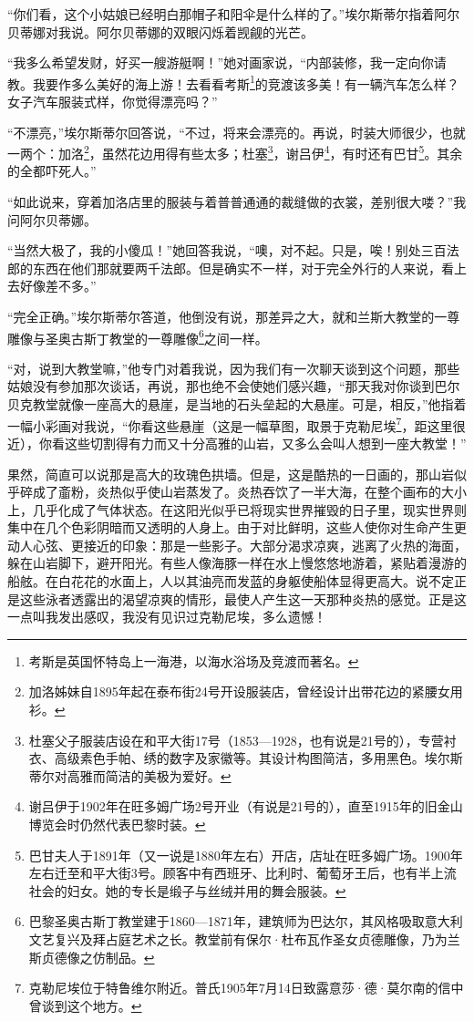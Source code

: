 \par “你们看，这个小姑娘已经明白那帽子和阳伞是什么样的了。”埃尔斯蒂尔指着阿尔贝蒂娜对我说。阿尔贝蒂娜的双眼闪烁着觊觎的光芒。
\par “我多么希望发财，好买一艘游艇啊！”她对画家说，“内部装修，我一定向你请教。我要作多么美好的海上游！去看看考斯\footnote{考斯是英国怀特岛上一海港，以海水浴场及竞渡而著名。}的竞渡该多美！有一辆汽车怎么样？女子汽车服装式样，你觉得漂亮吗？”
\par “不漂亮，”埃尔斯蒂尔回答说，“不过，将来会漂亮的。再说，时装大师很少，也就一两个：加洛\footnote{加洛姊妹自1895年起在泰布街24号开设服装店，曾经设计出带花边的紧腰女用衫。}，虽然花边用得有些太多；杜塞\footnote{杜塞父子服装店设在和平大街17号（1853—1928，也有说是21号的），专营衬衣、高级素色手帕、绣的数字及家徽等。其设计构图简洁，多用黑色。埃尔斯蒂尔对高雅而简洁的美极为爱好。}，谢吕伊\footnote{谢吕伊于1902年在旺多姆广场2号开业（有说是21号的），直至1915年的旧金山博览会时仍然代表巴黎时装。}，有时还有巴甘\footnote{巴甘夫人于1891年（又一说是1880年左右）开店，店址在旺多姆广场。1900年左右迁至和平大街3号。顾客中有西班牙、比利时、葡萄牙王后，也有半上流社会的妇女。她的专长是缎子与丝绒并用的舞会服装。}。其余的全都吓死人。”
\par “如此说来，穿着加洛店里的服装与着普普通通的裁缝做的衣裳，差别很大喽？”我问阿尔贝蒂娜。
\par “当然大极了，我的小傻瓜！”她回答我说，“噢，对不起。只是，唉！别处三百法郎的东西在他们那就要两千法郎。但是确实不一样，对于完全外行的人来说，看上去好像差不多。”
\par “完全正确。”埃尔斯蒂尔答道，他倒没有说，那差异之大，就和兰斯大教堂的一尊雕像与圣奥古斯丁教堂的一尊雕像\footnote{巴黎圣奥古斯丁教堂建于1860—1871年，建筑师为巴达尔，其风格吸取意大利文艺复兴及拜占庭艺术之长。教堂前有保尔·杜布瓦作圣女贞德雕像，乃为兰斯贞德像之仿制品。}之间一样。
\par “对，说到大教堂嘛，”他专门对着我说，因为我们有一次聊天谈到这个问题，那些姑娘没有参加那次谈话，再说，那也绝不会使她们感兴趣，“那天我对你谈到巴尔贝克教堂就像一座高大的悬崖，是当地的石头垒起的大悬崖。可是，相反，”他指着一幅小彩画对我说，“你看这些悬崖（这是一幅草图，取景于克勒尼埃\footnote{克勒尼埃位于特鲁维尔附近。普氏1905年7月14日致露意莎·德·莫尔南的信中曾谈到这个地方。}，距这里很近），你看这些切割得有力而又十分高雅的山岩，又多么会叫人想到一座大教堂！”
\par 果然，简直可以说那是高大的玫瑰色拱墙。但是，这是酷热的一日画的，那山岩似乎碎成了齑粉，炎热似乎使山岩蒸发了。炎热吞饮了一半大海，在整个画布的大小上，几乎化成了气体状态。在这阳光似乎已将现实世界摧毁的日子里，现实世界则集中在几个色彩阴暗而又透明的人身上。由于对比鲜明，这些人使你对生命产生更动人心弦、更接近的印象：那是一些影子。大部分渴求凉爽，逃离了火热的海面，躲在山岩脚下，避开阳光。有些人像海豚一样在水上慢悠悠地游着，紧贴着漫游的船舷。在白花花的水面上，人以其油亮而发蓝的身躯使船体显得更高大。说不定正是这些泳者透露出的渴望凉爽的情形，最使人产生这一天那种炎热的感觉。正是这一点叫我发出感叹，我没有见识过克勒尼埃，多么遗憾！

